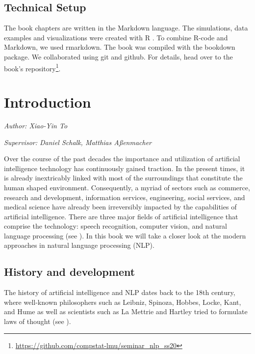 \documentclass[]{krantz}
\renewcommand{\href}[2]{#2\footnote{\url{#1}}}
\begin{document}
\hypertarget{technical-setup}{%
\section*{Technical Setup}\label{technical-setup}}


The book chapters are written in the Markdown language.
The simulations, data examples and visualizations were created with R \citep{rlang}.
To combine R-code and Markdown, we used rmarkdown.
The book was compiled with the bookdown package.
We collaborated using git and github.
For details, head over to the \href{https://github.com/compstat-lmu/seminar_nlp_ss20}{book's repository}.

\hypertarget{introduction}{%
\chapter{Introduction}\label{introduction}}

\emph{Author: Xiao-Yin To}

\emph{Supervisor: Daniel Schalk, Matthias Aßenmacher}

Over the course of the past decades the importance and utilization of artificial intelligence technology has continuously gained traction. In the present times, it is already inextricably linked with most of the surroundings that constitute the human shaped environment. Consequently, a myriad of sectors such as commerce, research and development, information services, engineering, social services, and medical science have already been irreversibly impacted by the capabilities of artificial intelligence.
There are three major fields of artificial intelligence that comprise the technology: speech recognition, computer vision, and natural language processing (see \citet{yeung2020}).
In this book we will take a closer look at the modern approaches in natural language processing (NLP).

\hypertarget{history-and-development}{%
\section{History and development}\label{history-and-development}}

The history of artificial intelligence and NLP dates back to the 18th century, where well-known philosophers such as Leibniz, Spinoza, Hobbes, Locke, Kant, and Hume as well as scientists such as La Mettrie and Hartley tried to formulate laws of thought (see \citet{mccorduck2004}).
\end{document}
